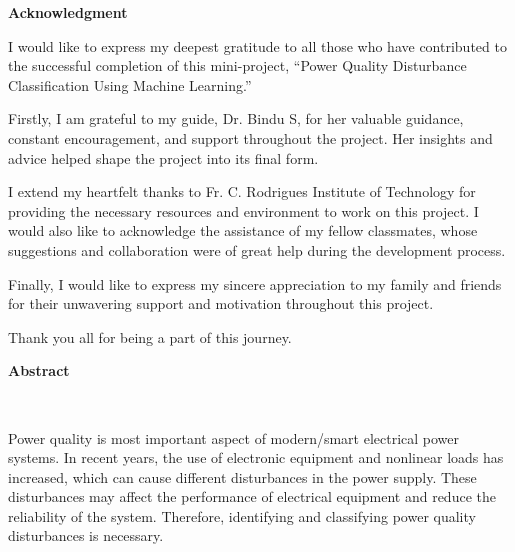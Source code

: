 \documentclass[12pt]{article}
\begin{document}
\begin{center}
\begin{center}
    \vspace{2cm}
    \textbf{\LARGE Acknowledgment}\\[2cm]
\end{center}

\justifying

I would like to express my deepest gratitude to all those who have contributed to the successful completion of this mini-project, ``Power Quality Disturbance Classification Using Machine Learning.''

\vspace{0.5cm}

Firstly, I am grateful to my guide, Dr. Bindu S, for her valuable guidance, constant encouragement, and support throughout the project. Her insights and advice helped shape the project into its final form.

\vspace{0.5cm}

I extend my heartfelt thanks to Fr. C. Rodrigues Institute of Technology for providing the necessary resources and environment to work on this project. I would also like to acknowledge the assistance of my fellow classmates, whose suggestions and collaboration were of great help during the development process.

\vspace{0.5cm}

Finally, I would like to express my sincere appreciation to my family and friends for their unwavering support and motivation throughout this project.

\vspace{0.5cm}

Thank you all for being a part of this journey.

\clearpage
\begin{center}
    \vspace{2cm}
    \textbf{\LARGE Abstract}\\[2cm]
\end{center}\\
\raggedright
\justifying
Power quality is most  important aspect of modern/smart electrical power systems. In recent years, the use of electronic equipment and nonlinear loads has increased, which can cause different disturbances in the power supply. These disturbances may affect the performance of electrical equipment and reduce the reliability of the system. Therefore, identifying and classifying power quality disturbances is necessary.\\


\end{center}
\end{document}
